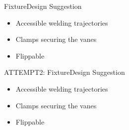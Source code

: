 \begin{frame}{Fixture}{Design Suggestion}
\begin{itemize}
    \item Accessible welding trajectories
    \item Clamps securing the vanes
    \item Flippable
\end{itemize}



\end{frame}

\begin{frame}{ATTEMPT2: Fixture}{Design Suggestion}
\begin{itemize}
    \item Accessible welding trajectories
    \item Clamps securing the vanes
    \item Flippable
\end{itemize}



\end{frame}

